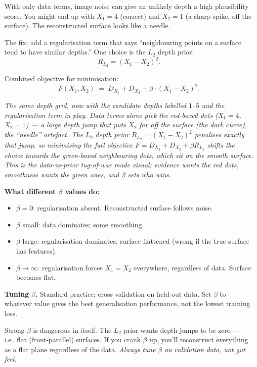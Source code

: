 \documentclass[11pt, a4paper]{article}
\begin{document}
\begin{exbox}
With only data terms, image noise can give an unlikely depth a high plausibility score. You might end up with $X_1 = 4$ (correct) and $X_2 = 1$ (a sharp spike, off the surface). The reconstructed surface looks like a needle.
\end{exbox}

The fix: add a regularisation term that says ``neighbouring points on a surface tend to have similar depths.'' One choice is the $L_2$ depth prior:
\[
R_{L_2} = (X_1 - X_2)^2.
\]

Combined objective for minimisation:
\[
F(X_1, X_2) \;=\; D_{X_1} + D_{X_2} + \beta \cdot (X_1 - X_2)^2.
\]

\begin{center}

\footnotesize\textit{The same depth grid, now with the candidate depths labelled $1$--$5$ and the regularisation term in play. Data terms alone pick the red-boxed dots ($X_1=4$, $X_2=1$) --- a large depth jump that puts $X_2$ far off the surface (the dark curve), the ``needle'' artefact. The $L_2$ depth prior $R_{L_2}=(X_1-X_2)^2$ penalises exactly that jump, so minimising the full objective $F=D_{X_1}+D_{X_2}+\beta R_{L_2}$ shifts the choice towards the green-boxed neighbouring dots, which sit on the smooth surface. This is the data-vs-prior tug-of-war made visual: evidence wants the red dots, smoothness wants the green ones, and $\beta$ sets who wins.}
\end{center}

\textbf{What different $\beta$ values do:}
\begin{itemize}
  \item $\beta = 0$: regularisation absent. Reconstructed surface follows noise.
  \item $\beta$ small: data dominates; some smoothing.
  \item $\beta$ large: regularisation dominates; surface flattened (wrong if the true surface has features).
  \item $\beta \to \infty$: regularisation forces $X_1 = X_2$ everywhere, regardless of data. Surface becomes flat.
\end{itemize}

\textbf{Tuning $\beta$.} Standard practice: cross-validation on held-out data. Set $\beta$ to whatever value gives the best generalisation performance, not the lowest training loss.

\begin{pitfallbox}
Strong $\beta$ is dangerous in itself. The $L_2$ prior wants depth jumps to be zero — i.e.\ flat (front-parallel) surfaces. If you crank $\beta$ up, you'll reconstruct everything as a flat plane regardless of the data. \emph{Always tune $\beta$ on validation data, not gut feel.}
\end{pitfallbox}
\end{document}
